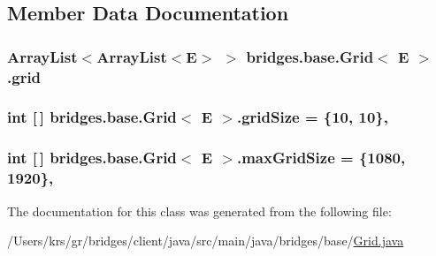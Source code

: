 \subsection{Member Data Documentation}
\hypertarget{classbridges_1_1base_1_1_grid_ad1f3f6968d58188425bd992c05c655a6}{}
\subsubsection[{grid}]{\setlength{\rightskip}{0pt plus 5cm}Array\+List$<$Array\+List$<$E$>$ $>$ {\bf bridges.\+base.\+Grid}$<$ E $>$.grid\hspace{0.3cm}{\ttfamily [protected]}}\label{classbridges_1_1base_1_1_grid_ad1f3f6968d58188425bd992c05c655a6}
\hypertarget{classbridges_1_1base_1_1_grid_a54a66479f78022570253d771206a0420}{}
\subsubsection[{grid\+Size}]{\setlength{\rightskip}{0pt plus 5cm}int \mbox{[}$\,$\mbox{]} {\bf bridges.\+base.\+Grid}$<$ E $>$.grid\+Size = \{10, 10\}\hspace{0.3cm}{\ttfamily [static]}, {\ttfamily [protected]}}\label{classbridges_1_1base_1_1_grid_a54a66479f78022570253d771206a0420}
\hypertarget{classbridges_1_1base_1_1_grid_a803fd4c070a22863c82581f0bb258c1c}{}
\subsubsection[{max\+Grid\+Size}]{\setlength{\rightskip}{0pt plus 5cm}int \mbox{[}$\,$\mbox{]} {\bf bridges.\+base.\+Grid}$<$ E $>$.max\+Grid\+Size = \{1080, 1920\}\hspace{0.3cm}{\ttfamily [static]}, {\ttfamily [protected]}}\label{classbridges_1_1base_1_1_grid_a803fd4c070a22863c82581f0bb258c1c}


The documentation for this class was generated from the following file\+:\begin{DoxyCompactItemize}
\item 
/\+Users/krs/gr/bridges/client/java/src/main/java/bridges/base/\hyperlink{_grid_8java}{Grid.\+java}\end{DoxyCompactItemize}
